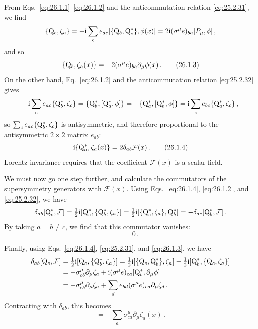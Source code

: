From Eqs.~\eqref{eq:26.1.1}--\eqref{eq:26.1.2} and the anticommutation
relation \eqref{eq:25.2.31}, we find
\[
  \{\mathrm{Q}_b,\zeta_a\}
  =-\mathrm{i}\sum_c e_{ac}[\{\mathrm{Q}_b,\mathrm{Q}_c^*\},\phi(x)]
  =2\mathrm{i}(\sigma^\mu e)_{ba}[P_\mu,\phi]\,,
\]
and so
\begin{equation}
  \{\mathrm{Q}_b,\zeta_a(x)\}
  =-2(\sigma^\mu e)_{ba}\partial_\mu\phi(x)\,.
  \tag{26.1.3}\label{eq:26.1.3}
\end{equation}
On the other hand, Eq.~\eqref{eq:26.1.2} and the anticommutation relation
\eqref{eq:25.2.32} gives
\[
  -\mathrm{i}\sum_c e_{ac}\{\mathrm{Q}_b^*,\zeta_c\}
  =\{\mathrm{Q}_b^*,[\mathrm{Q}_a^*,\phi]\}
  =-\{\mathrm{Q}_a^*,[\mathrm{Q}_b^*,\phi]\}
  =\mathrm{i}\sum_c e_{bc}\{\mathrm{Q}_a^*,\zeta_c\}\,,
\]
so \(\sum_c e_{ac}\{\mathrm{Q}_b^*,\zeta_c\}\) is antisymmetric, and therefore
proportional to the antisymmetric \(2\times2\) matrix \(e_{ab}\):
\begin{equation}
  \mathrm{i}\{\mathrm{Q}_b^*,\zeta_a(x)\}=2\delta_{ab}\mathcal{F}(x)\,.
  \tag{26.1.4}\label{eq:26.1.4}
\end{equation}
Lorentz invariance requires that the coefficient \(\mathcal{F}(x)\) is a
scalar field.

We must now go one step further, and calculate the commutators of the
supersymmetry generators with \(\mathcal{F}(x)\). Using
Eqs.~\eqref{eq:26.1.4}, \eqref{eq:26.1.2}, and \eqref{eq:25.2.32}, we have
\[
  \delta_{ab}[\mathrm{Q}_c^*,\mathcal{F}]
  =\tfrac12 \mathrm{i}[\mathrm{Q}_c^*,\{\mathrm{Q}_b^*,\zeta_a\}]
  =\tfrac12 \mathrm{i}[\{\mathrm{Q}_c^*,\zeta_a\},\mathrm{Q}_b^*]
  =-\delta_{ac}[\mathrm{Q}_b^*,\mathcal{F}]\,.
\]
By taking \(a=b\ne c\), we find that this commutator vanishes:
\begin{equation}
  [\WeylQ_c^*,\mathcal{F}(x)]=0\,.
  \tag{26.1.5}\label{eq:26.1.5}
\end{equation}

Finally, using Eqs.~\eqref{eq:26.1.4}, \eqref{eq:25.2.31}, and
\eqref{eq:26.1.3}, we have
\[
  \begin{aligned}
  \delta_{ab}[\mathrm{Q}_c,\mathcal{F}]
  &=\tfrac12 \mathrm{i}[\mathrm{Q}_c,\{\mathrm{Q}_b^*,\zeta_a\}]
    =\tfrac12 \mathrm{i}[\{\mathrm{Q}_c,\mathrm{Q}_b^*\},\zeta_a]
      -\tfrac12 \mathrm{i}[\mathrm{Q}_b^*,\{\mathrm{Q}_c,\zeta_a\}]
  \\
  &=-\sigma^\mu_{cb}\partial_\mu\zeta_a
    +\mathrm{i}(\sigma^\mu e)_{ca}[\mathrm{Q}_b^*,\partial_\mu\phi]
  \\
  &=-\sigma^\mu_{cb}\partial_\mu\zeta_a
    +\sum_d e_{bd}(\sigma^\mu e)_{ca}\partial_\mu\zeta_d\,.
  \end{aligned}
\]
Contracting with \(\delta_{ab}\), this becomes
\begin{equation}
  [\WeylQ_c,\mathcal{F}(x)]
  =-\sum_a\sigma^\mu_{ca}\partial_\mu\zeta_a(x)\,.
  \tag{26.1.6}\label{eq:26.1.6}
\end{equation}

